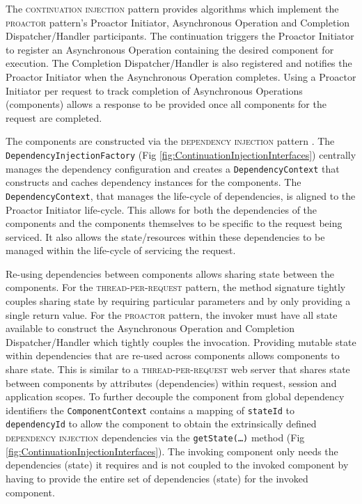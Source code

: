 \documentclass[prodmode]{style/acmlarge}
\begin{document}
The \textsc{continuation injection} pattern provides algorithms which implement the
\textsc{proactor} pattern's Proactor Initiator, Asynchronous Operation and
Completion Dispatcher/Handler participants.  The continuation triggers the
Proactor Initiator to register an Asynchronous Operation containing the desired
component for execution.  The Completion Dispatcher/Handler is also registered
and notifies the Proactor Initiator when the Asynchronous Operation completes.
Using a Proactor Initiator per request to track completion of Asynchronous
Operations (components) allows a response to be provided once all components for
the request are completed.

The components are constructed via the \textsc{dependency injection} pattern
\cite{ioc}.  The \texttt{Dependency\-InjectionFactory} (Fig
\ref{fig:ContinuationInjectionInterfaces}) centrally manages the dependency
configuration and creates a \texttt{Depend\-ency\-Context} that constructs and
caches dependency instances for the components.  The
\texttt{Dependency\-Context}, that manages the life-cycle of dependencies, is
aligned to the Proactor Initiator life-cycle.  This allows for both the
dependencies of the components and the components themselves to be specific to
the request being serviced.  It also allows the state/resources within these
dependencies to be managed within the life-cycle of servicing the request.

Re-using dependencies between components allows sharing state between the
components.  For the \textsc{thread-per-request} pattern, the method signature
tightly couples sharing state by requiring particular parameters and by only
providing a single return value.  For the \textsc{proactor} pattern, the invoker
must have all state available to construct the Asynchronous Operation and
Completion Dispatcher/Handler which tightly couples the invocation.  Providing
mutable state within dependencies that are re-used across components allows
components to share state.  This is similar to a \textsc{thread-per-request} web
server that shares state between components by attributes (dependencies) within
request, session and application scopes.  To further decouple the component from
global dependency identifiers the \texttt{ComponentContext} contains a mapping
of \texttt{stateId} to \texttt{dependencyId} to allow the component to obtain
the extrinsically defined \textsc{dependency injection} dependencies via the
\texttt{getState(\ldots)} method (Fig
\ref{fig:ContinuationInjectionInterfaces}).  The invoking component only needs
the dependencies (state) it requires and is not coupled to the invoked component
by having to provide the entire set of dependencies (state) for the invoked
component.
\end{document}
